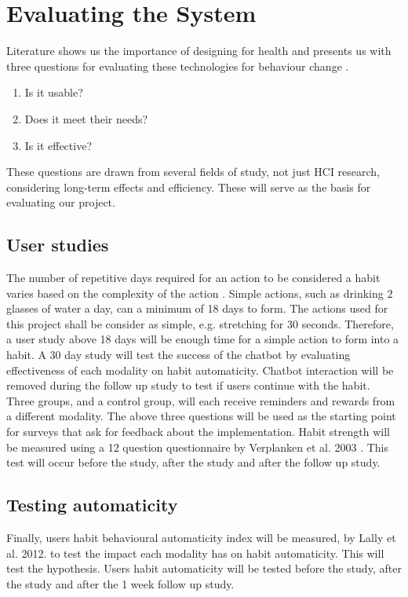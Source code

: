 
\newpage
\section{Evaluating the System}

Literature shows us the importance of designing for health and presents us with three questions for evaluating these technologies for behaviour change \cite{article_designing_for_health_behaviour_change_hci}.
\begin{enumerate}
\item Is it usable?
\item Does it meet their needs?
\item Is it effective?
\end{enumerate}
These questions are drawn from several fields of study, not just HCI research, considering long-term effects and efficiency. These will serve as the basis for evaluating our project.

\subsection{User studies}
The number of repetitive days required for an action to be considered a habit varies based on the complexity of the action \cite{article_how_habits_formed_modelling_habit_formation}. Simple actions, such as drinking 2 glasses of water a day, can a minimum of 18 days to form. The actions used for this project shall be consider as simple, e.g. stretching for 30 seconds. Therefore, a user study above 18 days will be  enough time for a simple action to form into a habit.\newline
\newline
A 30 day study will test the success of the chatbot by evaluating effectiveness of each modality on habit automaticity. Chatbot interaction will be removed during the follow up study to test if users continue with the habit. Three groups, and a control group, will each receive reminders and rewards from a different modality. The above three questions will be used as the starting point for surveys that ask for feedback about the implementation. Habit strength will be measured using a 12 question questionnaire by Verplanken et al. 2003 \cite{article_habit_strength}. This test will occur before the study, after the study and after the follow up study.

\subsection{Testing automaticity}
Finally, users habit behavioural automaticity index will be measured, by Lally et al. 2012. \cite{article_habit_measurement} to test the impact each modality has on habit automaticity. This will test the hypothesis.  Users habit automaticity will be tested before the study, after the study and after the 1 week follow up study.
